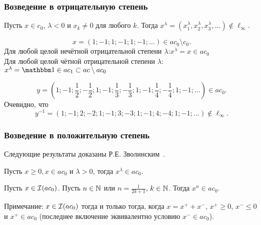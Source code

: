 \begin{frame}\frametitle{Возведение в отрицательную степень}
	\begin{llemma}
		Пусть $x\in c_0$, $\lambda< 0$ и $x_k\ne 0 $ для любого $k$.
		Тогда
		$
			x^\lambda = (x_1^\lambda,x_2^\lambda,x_3^\lambda,...) \notin \ell_\infty
			.
		$
	\end{llemma}

	\begin{eexample}
		\begin{equation}
			x = (1;-1;1;-1;1;-1;...) \in ac_0 \setminus c_0
			.
		\end{equation}
		Для любой целой нечётной отрицательной степени $\lambda$:\quad $x^\lambda = x \in ac_0$
		\\
		Для любой целой чётной отрицательной степени $\lambda$:\quad\quad
		$
			x^\lambda  = \one \in ac_1 \subset ac \setminus ac_0
		$
	\end{eexample}

	\begin{eexample}
		\begin{equation}
			y = \left(1;-1;\frac12;-\frac12;1;-1;\frac13;-\frac13;1;-1;\frac14;-\frac14;1;-1;...\right) \in ac_0
			.
		\end{equation}
		Очевидно, что
		\begin{equation}
			y^{-1} = \left(1;-1;2;-2;1;-1;3;-3;1;-1;4;-4;1;-1;...\right)  \notin \ell_\infty
			.
		\end{equation}
	\end{eexample}

\end{frame}




\begin{frame}\frametitle{Возведение в положительную степень}
	Следующие результаты доказаны Р.Е. Зволинским~\cite{zvol2022ac}.

	\begin{ttheorem}
		\label{thm:Zvol_pow_pos}
		Пусть $x \geqslant 0, x \in a c_0$ и $\lambda>0$, тогда $x^\lambda \in a c_0$.
	\end{ttheorem}

	\begin{ttheorem}
		\label{thm:Zvol_pow_composed}
		Пусть $x\in \mathcal{I}(ac_0)$.
		Пусть $n\in\mathbb{N}$ или $n = \frac1{2k+1}$, $k\in\mathbb{N}$.
		Тогда $x^n \in ac_0$.
	\end{ttheorem}

	Примечание: $x\in \mathcal{I}(ac_0)$ тогда и только тогда, когда $x = x^+ +x^-$, $x^+\geq 0$, $x^- \leq 0$ и $x^+ \in ac_0$
	(последнее включение эквивалентно условию $x^- \in ac_0$).

\end{frame}



